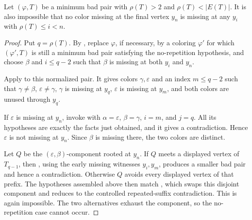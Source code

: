 \begin{lemma}
Let \((\varphi,T)\) be a minimum bad pair with \(\rho(T)>2\) and
\(\rho(T)<|E(T)|\).  It is also impossible that no color missing at the
final vertex \(y_n\) is missing at any \(y_i\) with
\(\rho(T)\le i<n\).
\end{lemma}
\begin{proof}
Put \(q=\rho(T)\).  By
, replace \(\varphi\), if
necessary, by a coloring \(\varphi'\) for which \((\varphi',T)\) is
still a minimum bad pair satisfying the no-repetition hypothesis, and
choose \(\beta\) and \(i\le q-2\) such that \(\beta\) is missing at
both \(y_i\) and \(y_n\).

Apply  to this normalized pair.  It
gives colors \(\gamma,\varepsilon\) and an index \(m\le q-2\) such
that \(\gamma\ne\beta\), \(\varepsilon\ne\gamma\), \(\gamma\) is
missing at \(y_q\), \(\varepsilon\) is missing at \(y_m\), and both
colors are unused through \(y_q\).

If \(\varepsilon\) is missing at \(y_n\), invoke
 with
\(\alpha=\varepsilon\), \(\beta=\gamma\), \(i=m\), and \(j=q\).
All its hypotheses are exactly the facts just obtained, and it gives a
contradiction.  Hence \(\varepsilon\) is not missing at \(y_n\).
Since \(\beta\) is missing there, the two colors are distinct.

Let \(Q\) be the \((\varepsilon,\beta)\)-component rooted at \(y_n\).
If \(Q\) meets a displayed vertex of \(T_{q-1}\), then
, using the early
missing witnesses \(y_i,y_m\), produces a smaller bad pair and hence a
contradiction.  Otherwise \(Q\) avoids every displayed vertex of that
prefix.  The hypotheses assembled above then match
, which swaps this disjoint
component and reduces to the controlled repeated-suffix contradiction.
This is again impossible.  The two alternatives exhaust the component,
so the no-repetition case cannot occur.
\end{proof}
